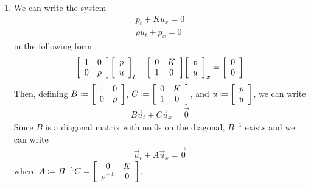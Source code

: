 \documentclass{article} %
\theoremstyle{plain}
\numberwithin{equation}{section} %
\numberwithin{figure}{section} %
\numberwithin{table}{section} %
\begin{document}
\begin{enumerate}[\ \ (a)]
    \item
        We can write the system
        \begin{align*}
            p_t + Ku_x = 0 \\
            \rho u_t + p_x = 0
        \end{align*}
        in the following form
        \begin{align*}
            \qty[\begin{array}{cc}
                1 & 0 \\
                0 & \rho
            \end{array}]\qty[\begin{array}{c}
                p \\ u
            \end{array}]_t + \qty[\begin{array}{cc}
                0 & K \\
                1 & 0
            \end{array}]\qty[\begin{array}{c}
                p \\ u
            \end{array}]_x = \qty[\begin{array}{c}
                0 \\ 0
            \end{array}]
        \end{align*}
        Then, defining $B \coloneqq \qty[\begin{array}{cc}1 & 0 \\ 0 & \rho\end{array}]$, $C \coloneqq \qty[\begin{array}{cc}0 & K \\ 1 & 0\end{array}]$, and $\vec{u} \coloneqq \qty[\begin{array}{c}p \\ u\end{array}]$, we can write
        \begin{align*}
            B\vec{u}_t + C\vec{u}_x = \vec{0}
        \end{align*}
        Since $B$ is a diagonal matrix with no $0$s on the diagonal, $B^{-1}$ exists and we can write
        \begin{align*}
            \vec{u}_t + A\vec{u}_x = \vec{0}
        \end{align*}
        where $A \coloneqq B^{-1}C = \qty[\begin{array}{cc}0 & K \\ \rho^{-1} & 0\end{array}]$.

\end{enumerate}
\end{document}
